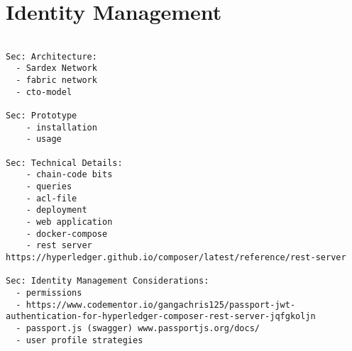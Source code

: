 \section{Identity Management}

\begin{verbatim}

Sec: Architecture:
  - Sardex Network
  - fabric network  
  - cto-model 
    
Sec: Prototype
    - installation
    - usage
    
Sec: Technical Details:
    - chain-code bits
    - queries
    - acl-file
    - deployment
    - web application
    - docker-compose
    - rest server https://hyperledger.github.io/composer/latest/reference/rest-server

Sec: Identity Management Considerations:
  - permissions
  - https://www.codementor.io/gangachris125/passport-jwt-authentication-for-hyperledger-composer-rest-server-jqfgkoljn
  - passport.js (swagger) www.passportjs.org/docs/
  - user profile strategies

\end{verbatim}
